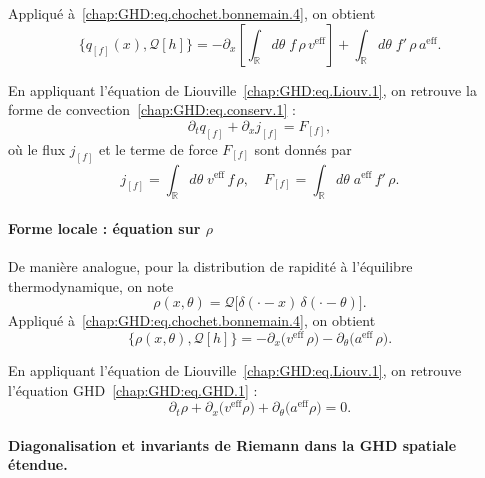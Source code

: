 Appliqué à~\eqref{chap:GHD:eq.chochet.bonnemain.4}, on obtient
\begin{equation}\label{chap:GHD:eq.chochet.bonnemain.5}
	\{q_{[f]}(x), \mathcal{Q}[h]\} 
	= - \partial_x \left[ \int_{\mathbb{R}} d\theta \; f \, \rho \, v^{\mathrm{eff}} \right]
	+ \int_{\mathbb{R}} d\theta \; f' \, \rho \, a^{\mathrm{eff}}.
\end{equation}

En appliquant l’équation de Liouville~\eqref{chap:GHD:eq.Liouv.1}, on retrouve la forme de convection~\eqref{chap:GHD:eq.conserv.1} :
\begin{equation}\label{chap:GHD:eq.conserv.2}
	\partial_t q_{[f]} + \partial_x j_{[f]} = F_{[f]},
\end{equation}
où le flux $j_{[f]}$ et le terme de force $F_{[f]}$ sont donnés par
\begin{equation}\label{chap:GHD:eq.conserv.2.1}
	j_{[f]} = \int_{\mathbb{R}} d\theta \; v^{\mathrm{eff}} \, f \, \rho,
	\quad F_{[f]} = \int_{\mathbb{R}} d\theta \; a^{\mathrm{eff}} \, f' \, \rho.
\end{equation}

\paragraph{Forme locale : équation sur \texorpdfstring{$\rho$}{rho}} 
De manière analogue, pour la distribution de rapidité à l’équilibre thermodynamique, on note
\begin{equation}
	\rho(x,\theta) = \mathcal{Q}\big[ \delta(\cdot - x) \, \delta(\cdot - \theta) \big].
\end{equation}
Appliqué à~\eqref{chap:GHD:eq.chochet.bonnemain.4}, on obtient
\begin{equation}\label{chap:GHD:eq.chochet.bonnemain.6}
	\{\rho(x,\theta), \mathcal{Q}[h]\} 
	= - \partial_x \big( v^{\mathrm{eff}} \, \rho \big)
	  - \partial_\theta \big( a^{\mathrm{eff}} \, \rho \big).
\end{equation}

En appliquant l’équation de Liouville~\eqref{chap:GHD:eq.Liouv.1}, on retrouve l’équation GHD~\eqref{chap:GHD:eq.GHD.1} :
\begin{equation}\label{chap:GHD:eq.conserv.3}
	\partial_t \rho + \partial_x \big( v^{\mathrm{eff}} \rho \big)
	+ \partial_\theta \big( a^{\mathrm{eff}} \rho \big) = 0.
\end{equation}


\paragraph{Diagonalisation et invariants de Riemann dans la GHD spatiale étendue.}

